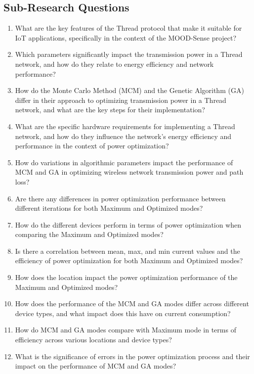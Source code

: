 \subsection*{Sub-Research Questions}
\begin{enumerate}
    \item What are the key features of the Thread protocol that make it suitable for IoT applications, specifically in the context of the MOOD-Sense project?
    \item Which parameters significantly impact the transmission power in a Thread network, and how do they relate to energy efficiency and network performance?
    \item How do the Monte Carlo Method (MCM) and the Genetic Algorithm (GA) differ in their approach to optimizing transmission power in a Thread network, and what are the key steps for their implementation?
    \item What are the specific hardware requirements for implementing a Thread network, and how do they influence the network's energy efficiency and performance in the context of power optimization?
    \item How do variations in algorithmic parameters impact the performance of MCM and GA in optimizing wireless network transmission power and path loss?
    \item Are there any differences in power optimization performance between different iterations for both Maximum and Optimized modes?
    \item How do the different devices perform in terms of power optimization when comparing the Maximum and Optimized modes?
    \item Is there a correlation between mean, max, and min current values and the efficiency of power optimization for both Maximum and Optimized modes?
    \item How does the location impact the power optimization performance of the Maximum and Optimized modes?
    \item How does the performance of the MCM and GA modes differ across different device types, and what impact does this have on current consumption?
    \item How do MCM and GA modes compare with Maximum mode in terms of efficiency across various locations and device types?
    \item What is the significance of errors in the power optimization process and their impact on the performance of MCM and GA modes?
\end{enumerate}


